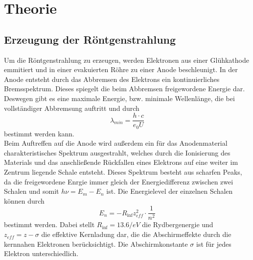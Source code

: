 \section{Theorie}
\label{sec:Theorie}

\subsection{Erzeugung der Röntgenstrahlung}
    Um die Röntgenstrahlung zu erzeugen, werden Elektronen aus einer 
    Glühkathode emmitiert und in einer evakuierten Röhre zu einer Anode beschleunigt. In der Anode
    entsteht durch das Abbremsen des Elektrons ein kontinuierliches Bremsspektrum. Dieses spiegelt
    die beim Abbremsen freigewordene Energie dar. Deswegen gibt es eine maximale Energie, bzw. 
    minimale Wellenlänge, die bei vollständiger Abbremsung auftritt und durch
    \begin{equation}
        \lambda_{min}=\dfrac{h\cdot c}{e_0 U}
        \label{eqn:lambda}
    \end{equation}
    bestimmt werden kann.
    \\
    
    Beim Auftreffen auf die Anode wird außerdem ein für das Anodenmaterial 
    charakteristisches Spektrum ausgestrahlt, welches durch die 
    Ionisierung des Materials und das anschließende Rückfallen eines Elektrons auf eine weiter im 
    Zentrum liegende Schale entsteht. Dieses Spektrum besteht aus scharfen Peaks, da die 
    freigewordene Enrgie immer gleich der Energiedifferenz zwischen zwei Schalen 
    und somit $h \nu = E_m-E_n$ ist. Die Energielevel der einzelnen Schalen können
    durch 
    \begin{equation}
        E_n=-R_{\inf}z_{eff}^2\cdot \dfrac{1}{n^2}
        \label{eqn:energieeins}
    \end{equation}
    bestimmt werden. Dabei stellt $R_{\inf} = 13.6 / eV$ die Rydbergenergie und 
    $z_{eff}=z-\sigma$ die effektive Kernladung dar, die die 
    Abschirmeffekte durch die kernnahen Elektronen berücksichtigt. Die Abschirmkonstante 
    $\sigma$ ist für jedes Elektron unterschiedlich.
    \\


